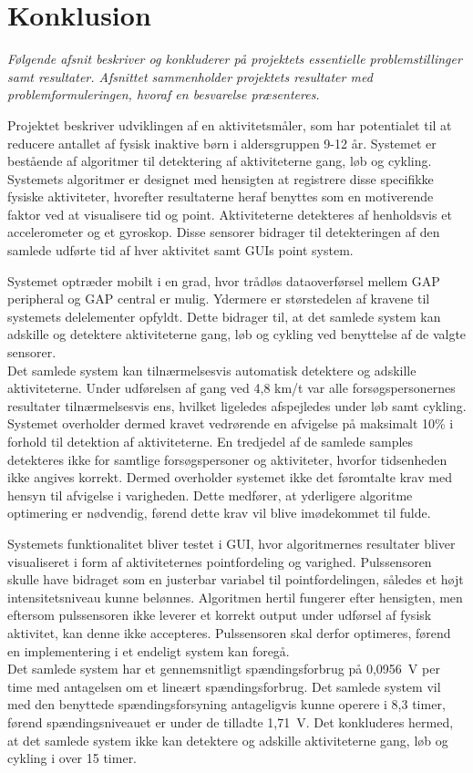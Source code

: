 \section{Konklusion}
\textit{Følgende afsnit beskriver og konkluderer på projektets essentielle problemstillinger samt resultater. Afsnittet sammenholder projektets resultater med problemformuleringen, hvoraf en besvarelse præsenteres.}

Projektet beskriver udviklingen af en aktivitetsmåler, som har potentialet til at reducere antallet af fysisk inaktive børn i aldersgruppen 9-12 år. Systemet er bestående af algoritmer til detektering af aktiviteterne gang, løb og cykling. Systemets algoritmer er designet med hensigten at registrere disse specifikke fysiske aktiviteter, hvorefter resultaterne heraf benyttes som en motiverende faktor ved at visualisere tid og point. Aktiviteterne detekteres af henholdsvis et accelerometer og et gyroskop. Disse sensorer bidrager til detekteringen af den samlede udførte tid af hver aktivitet samt GUIs point system.

Systemet optræder  mobilt i en grad, hvor trådløs dataoverførsel mellem GAP peripheral og GAP central er mulig. Ydermere er størstedelen af kravene til systemets delelementer opfyldt. Dette bidrager til, at det samlede system kan adskille og detektere aktiviteterne gang, løb og cykling ved benyttelse af de valgte sensorer. \\
Det samlede system kan tilnærmelsesvis automatisk detektere og adskille aktiviteterne. Under udførelsen af gang ved 4,8 km/t var alle forsøgspersonernes resultater tilnærmelsesvis ens, hvilket ligeledes afspejledes under løb samt cykling. Systemet overholder dermed kravet vedrørende en afvigelse på maksimalt 10\% i forhold til detektion af aktiviteterne. En tredjedel af de samlede samples detekteres ikke for samtlige forsøgspersoner og aktiviteter, hvorfor tidsenheden ikke angives korrekt. Dermed overholder systemet ikke det føromtalte krav med hensyn til afvigelse i varigheden. Dette medfører, at yderligere algoritme optimering er nødvendig, førend dette krav vil blive imødekommet til fulde.

Systemets funktionalitet bliver testet i GUI, hvor algoritmernes resultater bliver visualiseret i form af aktiviteternes pointfordeling og varighed. Pulssensoren skulle have bidraget som en justerbar variabel til pointfordelingen, således et højt intensitetsniveau kunne belønnes. Algoritmen hertil fungerer efter hensigten, men eftersom pulssensoren ikke leverer et korrekt output under udførsel af fysisk aktivitet, kan denne ikke accepteres. Pulssensoren skal derfor optimeres, førend en implementering i et endeligt system kan foregå. \\
Det samlede system har et gennemsnitligt spændingsforbrug på 0,0956~V per time med antagelsen om et lineært spændingsforbrug. Det samlede system vil med den benyttede spændingsforsyning antageligvis kunne operere i 8,3 timer, førend spændingsniveauet er under de tilladte 1,71~V. Det konkluderes hermed, at det samlede system ikke kan detektere og adskille aktiviteterne gang, løb og cykling i over 15 timer. 

